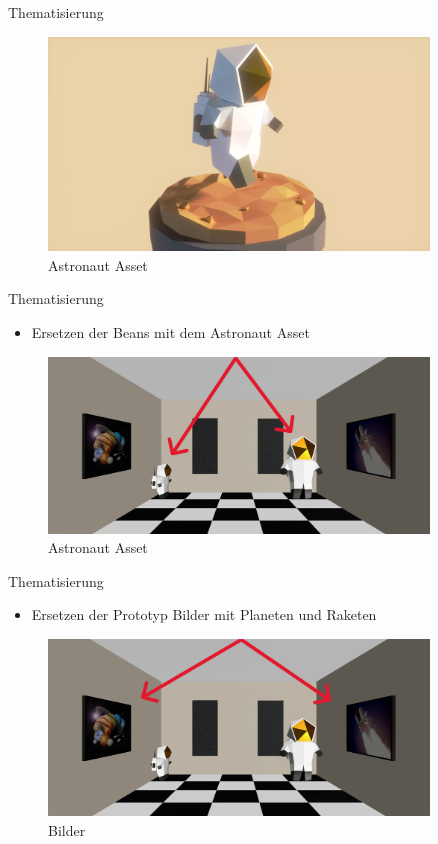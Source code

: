 \documentclass{beamer}
\begin{document}
\begin{frame}{Thematisierung}
\begin{figure}
    \centering
\includegraphics[width=0.9\textwidth, keepaspectratio]{img/astro}
\caption{Astronaut Asset \cite{astronaut}}
\end{figure}
\end{frame}


\begin{frame}{Thematisierung}
\begin{itemize}
\item Ersetzen der Beans mit dem Astronaut Asset
\end{itemize}
\begin{figure}
    \centering
\includegraphics[width=0.9\textwidth, keepaspectratio]{img/thema1}
\caption{Astronaut Asset \cite{astronaut}}
\end{figure}
\end{frame}


\begin{frame}{Thematisierung}
\begin{itemize}
\item Ersetzen der Prototyp Bilder mit Planeten und Raketen
\end{itemize}
\begin{figure}
    \centering
\includegraphics[width=0.9\textwidth, keepaspectratio]{img/thema2}
\caption{Bilder \cite{rakete} \cite{planet}}
\end{figure}
\end{frame}
\end{document}
